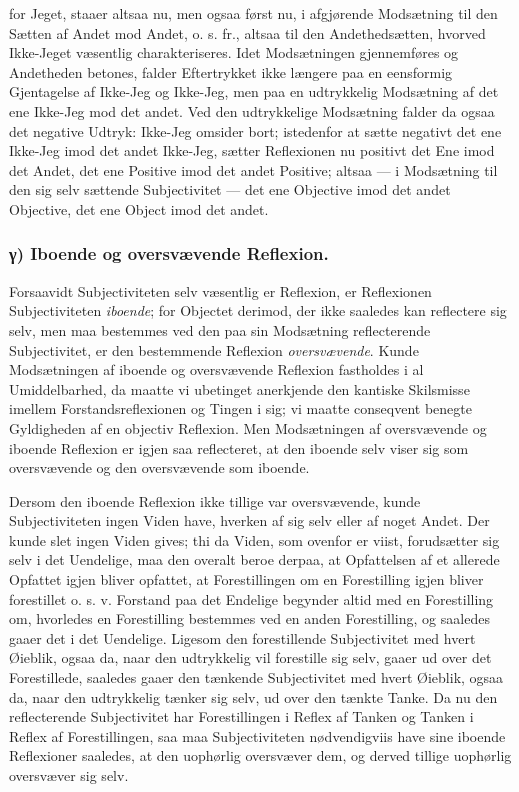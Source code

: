 \documentclass[11pt]{book}
\newcommand{\opage}[1]{\marginnote{\footnotesize\textit{[#1]}}}
\begin{document}
\opage{70} \setcounter{footnote}{0}%
for Jeget, staaer altsaa nu, men ogsaa først nu, i afgjørende Modsætning til den Sætten af Andet mod Andet, o. s. fr., altsaa til den Andethedsætten, hvorved Ikke-Jeget væsentlig charakteriseres. Idet Modsætningen gjennemføres og Andetheden betones, falder Eftertrykket ikke længere paa en eensformig Gjentagelse af Ikke-Jeg og Ikke-Jeg, men paa en udtrykkelig Modsætning af det ene Ikke-Jeg mod det andet. Ved den udtrykkelige Modsætning falder da ogsaa det negative Udtryk: Ikke-Jeg omsider bort; istedenfor at sætte negativt det ene Ikke-Jeg imod det andet Ikke-Jeg, sætter Reflexionen nu positivt det Ene imod det Andet, det ene Positive imod det andet Positive; altsaa --- i Modsætning til den sig selv sættende Subjectivitet --- det ene Objective imod det andet Objective, det ene Object imod det andet.

\subsubsection*{γ) Iboende og oversvævende Reflexion.}

Forsaavidt Subjectiviteten selv væsentlig er Reflexion, er Reflexionen Subjectiviteten \emph{iboende}; for Objectet derimod, der ikke saaledes kan reflectere sig selv, men maa bestemmes ved den paa sin Modsætning reflecterende Subjectivitet, er den bestemmende Reflexion \emph{oversvævende}. Kunde Modsætningen af iboende og oversvævende Reflexion fastholdes i al Umiddelbarhed, da maatte vi ubetinget anerkjende den kantiske Skilsmisse imellem Forstandsreflexionen og Tingen i sig; vi maatte conseqvent benegte Gyldigheden af en objectiv Reflexion. Men Modsætningen af oversvævende og iboende Reflexion er igjen saa reflecteret, at den iboende selv viser sig som oversvævende og den oversvævende som iboende.

Dersom den iboende Reflexion ikke tillige var oversvævende, kunde Subjectiviteten ingen Viden have, hverken af sig selv eller af noget Andet. Der kunde slet ingen Viden gives; thi da Viden, som ovenfor er viist, forudsætter sig selv i det Uendelige, maa den overalt beroe derpaa, at Opfattelsen af et allerede Opfattet igjen bliver opfattet, at Forestillingen om
\opage{71} \setcounter{footnote}{0}%
en Forestilling igjen bliver forestillet o. s. v. Forstand paa det Endelige begynder altid med en Forestilling om, hvorledes en Forestilling bestemmes ved en anden Forestilling, og saaledes gaaer det i det Uendelige. Ligesom den forestillende Subjectivitet med hvert Øieblik, ogsaa da, naar den udtrykkelig vil forestille sig selv, gaaer ud over det Forestillede, saaledes gaaer den tænkende Subjectivitet med hvert Øieblik, ogsaa da, naar den udtrykkelig tænker sig selv, ud over den tænkte Tanke. Da nu den reflecterende Subjectivitet har Forestillingen i Reflex af Tanken og Tanken i Reflex af Forestillingen, saa maa Subjectiviteten nødvendigviis have sine iboende Reflexioner saaledes, at den uophørlig oversvæver dem, og derved tillige uophørlig oversvæver sig selv.
\end{document}
